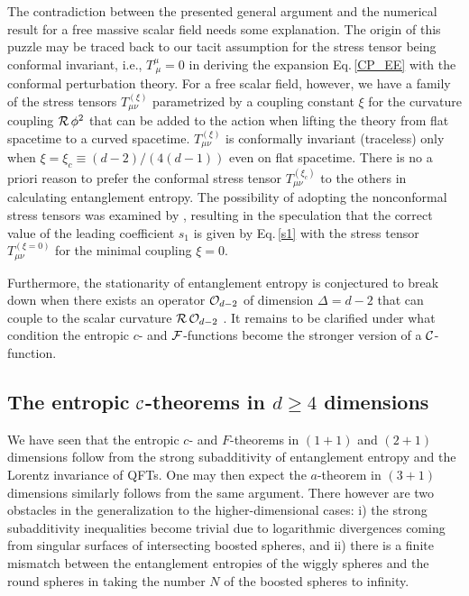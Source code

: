 The contradiction between the presented general argument and the numerical result for a free massive scalar field needs some explanation.
The origin of this puzzle may be traced back to our tacit assumption for the stress tensor being conformal invariant, i.e., $T^\mu_{~\mu} = 0$ in deriving the expansion Eq.\,\eqref{CP_EE} with the conformal perturbation theory.
For a free scalar field, however, we have a family of the stress tensors $T^{(\xi)}_{\mu\nu}$ parametrized by a coupling constant $\xi$ for the curvature coupling ${\cal R}\, \phi^2$ that can be added to the action when lifting the theory from flat spacetime to a curved spacetime.
$T^{(\xi)}_{\mu\nu}$ is conformally invariant (traceless) only when $\xi = \xi_c \equiv (d-2)/\left(4 (d-1)\right)$ even on flat spacetime.
There is no a priori reason to prefer the conformal stress tensor $T^{(\xi_c)}_{\mu\nu}$ to the others in calculating entanglement entropy.
The possibility of adopting the nonconformal stress tensors was examined by \textcite{Lee:2014zaa,Casini:2014yca,Herzog:2016bhv}, resulting in the speculation that the correct value of the leading coefficient $s_1$ is given by Eq.\,\eqref{s1} with the stress tensor $T^{(\xi = 0)}_{\mu\nu}$ for the minimal coupling $\xi = 0$.

Furthermore, the stationarity of entanglement entropy is conjectured to break down when there exists an operator ${\cal O}_{d-2}$ of dimension $\Delta = d-2$ that can couple to the scalar curvature ${\cal R}\,{\cal O}_{d-2}$ \cite{Herzog:2016bhv}.
It remains to be clarified under what condition the entropic $c$- and ${\cal F}$-functions become the stronger version of a ${\cal C}$-function.




\subsection{The entropic ${\cal C}$-theorems in $d\ge 4$ dimensions}\label{ss:C_theorem_Higher}
We have seen that the entropic $c$- and $F$-theorems in $(1+1)$ and $(2+1)$ dimensions follow from the strong subadditivity of entanglement entropy and the Lorentz invariance of QFTs.
One may then expect the $a$-theorem in $(3+1)$ dimensions similarly follows from the same argument. 
There however are two obstacles in the generalization to the higher-dimensional cases: i) the strong subadditivity inequalities become trivial due to logarithmic divergences coming from singular surfaces of intersecting boosted spheres, and ii) there is a finite mismatch between the entanglement entropies of the wiggly spheres and the round spheres in taking the number $N$ of the boosted spheres to infinity.

